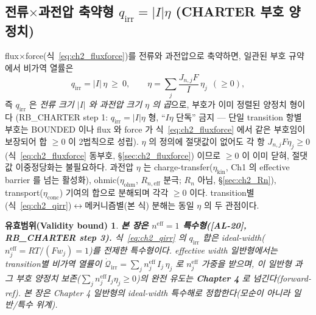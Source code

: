 \documentclass[11pt,a4paper]{article}
\newtheorem*{boundbox}{유효범위(Validity bound)}
\newcommand{\eff}{\mathrm{eff}}
\newcommand{\irr}{\mathrm{irr}}
\newcommand{\kin}{\mathrm{kin}}
\newcommand{\ohm}{\mathrm{ohm}}
\newcommand{\conc}{\mathrm{conc}}
\newcommand{\AL}[1]{\textsf{[AL-#1]}}
\begin{document}
\subsection{전류$\times$과전압 축약형 $q_\irr=|I|\eta$ (CHARTER 부호 양정치)}\label{sec:ch2_Ieta}
flux$\times$force(식~\eqref{eq:ch2_fluxforce})를 전류와 과전압으로 축약하면, 일관된 부호 규약에서 비가역 열률은
\begin{equation}
\boxed{\;q_{\irr}=|I|\,\eta\ \ge\ 0,\qquad \eta=\sum_j \frac{J_{n,j}F}{I}\,\eta_j\ \ (\ge0),\;}
\label{eq:ch2_qirr}
\end{equation}
즉 $q_\irr$ 은 \emph{전류 크기 $|I|$ 와 과전압 크기 $\eta$ 의 곱}으로, 부호가 이미 정렬된 양정치 형이다
(RB\_CHARTER step 1: $q_\irr=|I|\eta$ 형, ``$I\eta$ 단독'' 금지 — 단일 transition 항별 부호는 BOUNDED 이나
flux 와 force 가 식~\eqref{eq:ch2_fluxforce} 에서 같은 부호임이 보장되어 합 $\ge0$ 이 2법칙으로 성립). $\eta$ 의
정의에 절댓값이 없어도 각 항 $J_{n,j}F\eta_j\ge0$ (식~\eqref{eq:ch2_fluxforce} 동부호, \S\ref{sec:ch2_fluxforce})
이므로 $\ge0$ 이 이미 닫혀, 절댓값 이중정당화는 불필요하다. 과전압
$\eta$ 는 charge-transfer($\eta_\kin$, Ch1 의 effective barrier 를 넘는 활성화), ohmic($\eta_\ohm$,
$R_{n,\eff}$ 분극; $R_n$ 아님, \S\ref{sec:ch2_Rn}), transport($\eta_\conc$) 기여의 합으로 분해되며 각각 $\ge0$ 이다.
transition별(식~\eqref{eq:ch2_qirr})$\leftrightarrow$메커니즘별(본 식) 분해는 동일 $\eta$ 의 두 관점이다.
\begin{boundbox}
\textbf{본 장은 $n^{\eff}=1$ 특수형(\AL{20}, RB\_CHARTER step 3).} 식~\eqref{eq:ch2_qirr} 의 $q_\irr$ 합은
ideal-width($n_j^{\eff}=RT/(Fw_j)=1$)를 전제한 특수형이다. effective width 일반형에서는 transition별 비가역
열률이 $\dot{\mathcal Q}_{\irr}=\sum_j n_j^{\eff}\,I_j\,\eta_j$ 로 $n_j^{\eff}$ 가중을 받으며, 이 \emph{일반형}
과 그 부호 양정치 보존($\sum_j n_j^{\eff}I_j\eta_j\ge0$)의 완전 유도는 \textbf{Chapter 4} 로 넘긴다(forward-ref).
본 장은 Chapter 4 일반형의 ideal-width 특수해로 정합한다(모순이 아니라 일반/특수 위계).
\end{boundbox}
\end{document}

